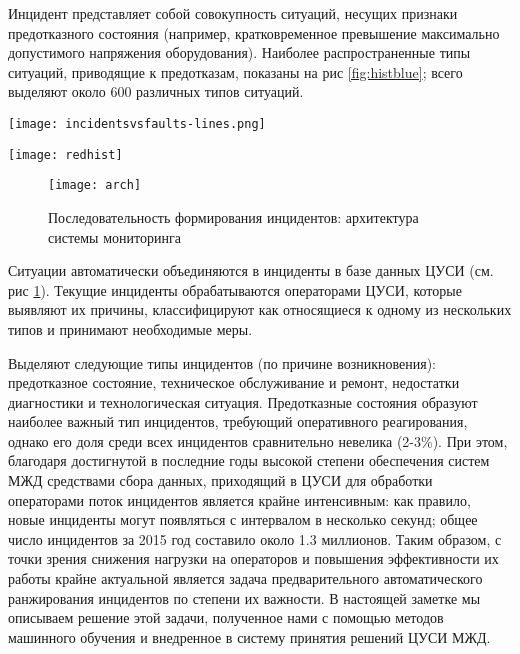 Инцидент представляет собой совокупность ситуаций, несущих признаки предотказного состояния (например, кратковременное превышение максимально допустимого напряжения оборудования). Наиболее распространенные типы ситуаций, приводящие к предотказам, показаны на рис \ref{fig:histblue}; всего выделяют около 600 различных типов ситуаций. %

\begin{figure*}
\centering
\texttt{[image: incidentsvsfaults-lines.png]}
\caption{Наиболее распространённые типы ситуаций, приводящих к предотказу}
\centering
\label{fig:histblue}
\end{figure*}

\begin{figure*}[t]
\centering
\texttt{[image: redhist]}
\caption{Наиболее распространённые типы ситуаций устройств телемеханики, приводящие к предотказу}
\centering
\label{fig:histred}
\end{figure*}

\begin{figure}[t]
\centering
\texttt{[image: arch]}
\caption{Последовательность формирования инцидентов: архитектура системы мониторинга}
\centering
\label{fig:arch}
\end{figure}

Ситуации автоматически объединяются в инциденты в базе данных ЦУСИ (см. рис \ref{fig:arch}). Текущие инциденты обрабатываются операторами ЦУСИ, которые выявляют их причины, классифицируют как относящиеся к одному из нескольких типов и принимают необходимые меры. 

Выделяют следующие типы инцидентов (по причине возникновения): предотказное состояние, техническое обслуживание и ремонт, недостатки диагностики и технологическая ситуация. Предотказные состояния образуют наиболее важный тип инцидентов, требующий оперативного реагирования, однако его доля среди всех инцидентов сравнительно невелика (2-3\%). При этом, благодаря достигнутой в последние годы высокой степени обеспечения систем МЖД средствами сбора данных, приходящий в ЦУСИ для обработки операторами поток инцидентов является крайне интенсивным: как правило, новые инциденты могут появляться с интервалом в несколько секунд; общее число инцидентов за 2015 год составило около 1.3 миллионов. 
Таким образом, с точки зрения снижения нагрузки на операторов и повышения эффективности их работы крайне актуальной является задача предварительного автоматического ранжирования инцидентов по степени их важности. В настоящей заметке мы описываем решение этой задачи, полученное нами с помощью методов машинного обучения и внедренное в систему принятия решений ЦУСИ МЖД. 

